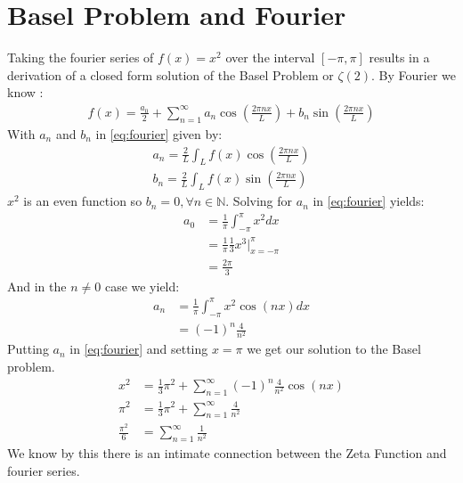 \documentclass[10pt, oneside]{article}
\newcommand{\N}{\mathbb{N}}
\begin{document}
\section{Basel Problem and Fourier}
  Taking the fourier series of $f(x) = x^2$ over the interval $[-\pi,\pi]$ results in a derivation of a closed form solution of the Basel Problem or $\zeta(2)$.
  By Fourier we know \cite{Fourier1890} \cite{Haberman2012}:
  \begin{align}
    f(x) = \frac{a_0}{2} + \sum_{n=1}^{\infty} a_n \cos(\frac{2 \pi n x}{L}) + b_n \sin(\frac{2 \pi n x}{L}) \label{eq:fourier}
  \end{align}
  With $a_n$ and $b_n$ in \ref{eq:fourier} given by:
  \begin{align*}
    a_n = \frac{2}{L} \int_{L} f(x) \cos(\frac{2 \pi n x}{L}) \\
    b_n = \frac{2}{L} \int_{L} f(x) \sin(\frac{2 \pi n x}{L})
  \end{align*}
  $x^2$ is an even function so $b_n = 0, \forall n \in \N$. Solving for $a_n$ in \ref{eq:fourier} yields:
  \begin{align*}
    a_0 &= \frac{1}{\pi} \int_{-\pi}^{\pi} x^2 dx \\
    &= \frac{1}{\pi} \frac{1}{3} x^3 |_{x=-\pi}^{\pi} \\
    &= \frac{2 \pi}{3}
  \end{align*}
  And in the $n \neq 0$ case we yield:
  \begin{align*}
    a_n &= \frac{1}{\pi} \int_{-\pi}^{\pi}x^2 \cos(nx) dx \\
    &= (-1)^n \frac{4}{n^2}
  \end{align*}
  Putting $a_n$ in \ref{eq:fourier} and setting $x=\pi$ we get our solution to the Basel problem.
  \begin{align*}
    x^2 &= \frac{1}{3} \pi^2 + \sum_{n=1}^{\infty} (-1)^n \frac{4}{n^2} \cos(nx) \\
    \pi^2 &= \frac{1}{3} \pi^2 + \sum_{n=1}^{\infty} \frac{4}{n^2} \\
    \frac{\pi^2}{6} &= \sum_{n=1}^{\infty} \frac{1}{n^2} 
  \end{align*} 
  We know by this there is an intimate connection between the Zeta Function and fourier series.
\end{document}
